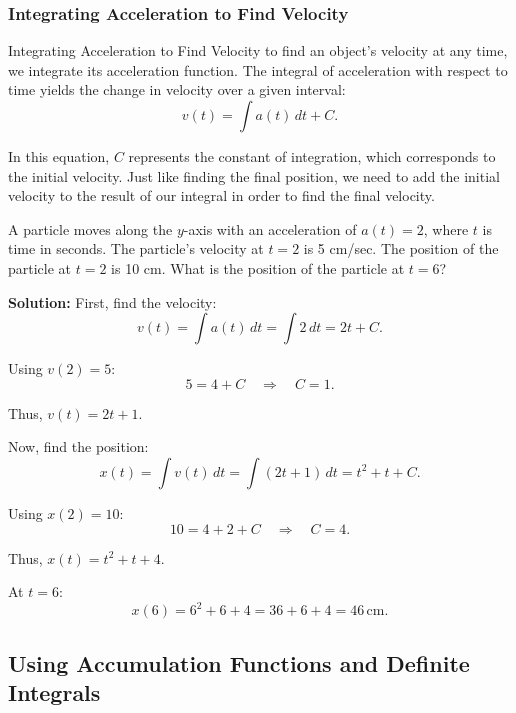 \documentclass[12pt]{article}
\theoremstyle{beautifulthm}
\begin{document}
\newpage
\subsubsection{Integrating Acceleration to Find Velocity
}

\begin{mytheorem}{Integrating Acceleration to Find Velocity}
     to find an object's velocity at any time, we integrate its acceleration function. The integral of acceleration with respect to time yields the change in velocity over a given interval:
\[
v(t) = \int a(t) \, dt + C.
\]

In this equation, $C$ represents the constant of integration, which corresponds to the initial velocity. Just like finding the final position, we need to add the initial velocity to the result of our integral in order to find the final velocity.
\end{mytheorem}

\begin{tcolorbox}[colback=examplebg, colframe=red!75!black, title=\textbf{EXAMPLE 3: Find the Integral of the Function}, fonttitle=\bfseries, sharp corners]
A particle moves along the $y$-axis with an acceleration of $a(t) = 2$, where $t$ is time in seconds. The particle's velocity at $t = 2$ is 5 cm/sec. The position of the particle at $t = 2$ is 10 cm. What is the position of the particle at $t = 6$?


\tcblower
\textbf{Solution:} 
First, find the velocity:
\[
v(t) = \int a(t) \, dt = \int 2 \, dt = 2t + C.
\]

Using $v(2) = 5$:
\[
5 = 4 + C \quad \Rightarrow \quad C = 1.
\]

Thus, $v(t) = 2t + 1$.

Now, find the position:
\[
x(t) = \int v(t) \, dt = \int (2t + 1) \, dt = t^2 + t + C.
\]

Using $x(2) = 10$:
\[
10 = 4 + 2 + C \quad \Rightarrow \quad C = 4.
\]

Thus, $x(t) = t^2 + t + 4$.

At $t = 6$:
\[
x(6) = 6^2 + 6 + 4 = 36 + 6 + 4 = 46 \, \text{cm}.
\]
\end{tcolorbox}




\subsection{ Using Accumulation Functions and Definite Integrals}
\end{document}
